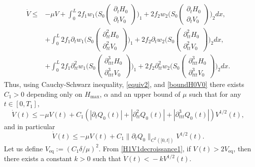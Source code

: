 \documentclass[11pt]{article}
\numberwithin{equation}{section}
\theoremstyle{definition}
\begin{document}
\begin{equation*}
\begin{split}
\dot V\leq& -\mu V
+ \int_{0}^{L}2f_{1}w_{1}\biggl(S_{0}\begin{pmatrix}\partial_{t}H_{0}\\ \partial_{t}V_{0}\end{pmatrix}\biggr)_{1}+2f_{2}w_{2}\biggl(S_{0}\begin{pmatrix}\partial_{t}H_{0}\\ \partial_{t}V_{0}\end{pmatrix}\biggr)_{2}dx,\\
&+ \int_{0}^{L}2f_{1}\partial_{t}w_{1}\biggl(S_{0}\begin{pmatrix}\partial_{tt}^{2}H_{0}\\ \partial_{tt}^{2}V_{0}\end{pmatrix}\biggr)_{1}+2f_{2}\partial_{t}w_{2}\biggl(S_{0}\begin{pmatrix}\partial_{tt}^{2}H_{0}\\ \partial_{tt}^{2}V_{0}\end{pmatrix}\biggr)_{2}dx,\\
&+ \int_{0}^{L}2f_{1}\partial_{tt}^{2}w_{1}\biggl(S_{0}\begin{pmatrix}\partial_{ttt}^{3}H_{0}\\ \partial_{ttt}^{3}V_{0}\end{pmatrix}\biggr)_{1}+2f_{2}\partial_{tt}^{2}w_{2}\biggl(S_{0}\begin{pmatrix}\partial_{ttt}^{3}H_{0}\\ \partial_{ttt}^{3}V_{0}\end{pmatrix}\biggr)_{2}dx.
\end{split}
\end{equation*}
Thus, using Cauchy-Schwarz inequality, \eqref{equiv2}, {and \eqref{boundH0V0}} there exists $C_{1}>0$
depending only on $H_{\max}$, $\alpha$ and an upper bound of $\mu$ such that for any $t\in[0,T_{1}]$,
\begin{equation}
\label{H1V1decroissance}
\dot V(t)\leq -\mu V(t)
+C_{1}\left(|\partial_{t}Q_{0}(t)|+|\partial_{tt}^{2}Q_{0}(t)|+|\partial_{ttt}^{3}Q_{0}(t)|\right)V^{1/2}(t),
\end{equation}
and in particular
\begin{equation}
\label{H1V1decroissance1}
\dot V(t)\leq -\mu V(t)
+C_{1}\lVert\partial_{t}Q_{0}\rVert_{C^{2}([0,{t]})}V^{1/2}(t).
\end{equation}
Let us define $V_\mathrm{eq}:=(C_{1}\delta/\mu)^{2}$. From \eqref{H1V1decroissance1}, if $V(t)>2V_\mathrm{eq}$, then there exists a constant $k\!>\!0$ such that $\dot V(t)\!<\!-k V^{1/2}(t)$.
\end{document}
